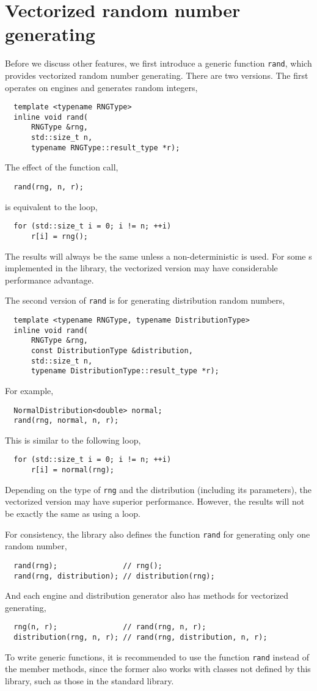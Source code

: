 \section{Vectorized random number generating}
\label{sec:Vectorized random number generating}

Before we discuss other features, we first introduce a generic function
\verb|rand|, which provides vectorized random number generating. There are two
versions. The first operates on \rng engines and generates random integers,
\begin{Verbatim}
  template <typename RNGType>
  inline void rand(
      RNGType &rng,
      std::size_t n,
      typename RNGType::result_type *r);
\end{Verbatim}
The effect of the function call,
\begin{Verbatim}
  rand(rng, n, r);
\end{Verbatim}
is equivalent to the loop,
\begin{Verbatim}
  for (std::size_t i = 0; i != n; ++i)
      r[i] = rng();
\end{Verbatim}
The results will always be the same unless a non-deterministic \rng is used.
For some \rng{}s implemented in the library, the vectorized version may have
considerable performance advantage.

The second version of \verb|rand| is for generating distribution random
numbers,
\begin{Verbatim}
  template <typename RNGType, typename DistributionType>
  inline void rand(
      RNGType &rng,
      const DistributionType &distribution,
      std::size_t n,
      typename DistributionType::result_type *r);
\end{Verbatim}
For example,
\begin{Verbatim}
  NormalDistribution<double> normal;
  rand(rng, normal, n, r);
\end{Verbatim}
This is similar to the following loop,
\begin{Verbatim}
  for (std::size_t i = 0; i != n; ++i)
      r[i] = normal(rng);
\end{Verbatim}
Depending on the type of \verb|rng| and the distribution (including its
parameters), the vectorized version may have superior performance. However, the
results will not be exactly the same as using a loop.

For consistency, the library also defines the function \verb|rand| for
generating only one random number,
\begin{Verbatim}
  rand(rng);               // rng();
  rand(rng, distribution); // distribution(rng);
\end{Verbatim}
And each \rng engine and distribution generator also has methods for vectorized
generating,
\begin{Verbatim}
  rng(n, r);               // rand(rng, n, r);
  distribution(rng, n, r); // rand(rng, distribution, n, r);
\end{Verbatim}
To write generic functions, it is recommended to use the function \verb|rand|
instead of the member methods, since the former also works with classes not
defined by this library, such as those in the standard library.


